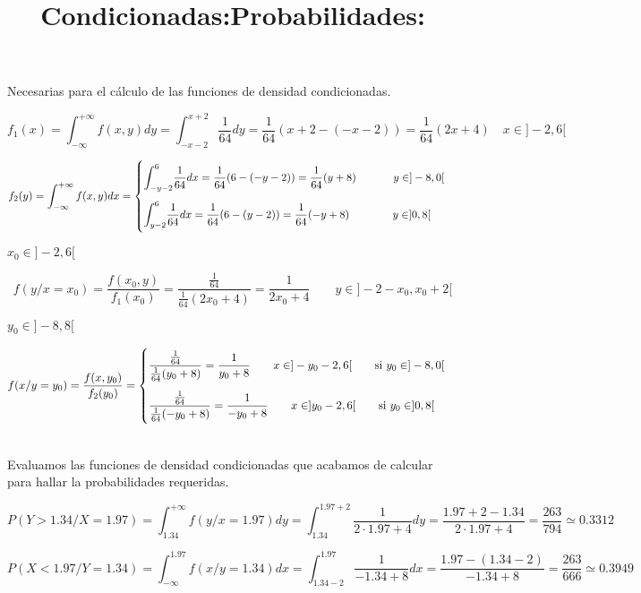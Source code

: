 \documentclass[tikz]{article}
\def\stretchint#1{\vcenter{\hbox{\stretchto[440]{\displaystyle\int}{#1}}}}
\begin{document}
Necesarias para el cálculo de las funciones de densidad condicionadas.

\[f_1(x) = \int_{-\infty}^{+\infty} f(x,y) dy =
\int_{-x-2}^{x+2}\frac{1}{64}dy=\frac{1}{64}(x+2-(-x-2))=\frac{1}{64}(2x+4)
\quad x \in ]-2,6[\]

\[f_2(y) = \int_{-\infty}^{+\infty} f(x,y) dx = \begin{cases} ~
    \vspace{-4mm}\\ \stretchint{5ex}_{\hspace{-1.5mm}-y-2}^6
    \dfrac{1}{64} dx = \dfrac{1}{64}(6-(-y-2))=\dfrac{1}{64}(y+8)
    \hspace{12mm} y \in ]-8,0[ \vspace{3mm}\\
    \stretchint{5ex}_{\hspace{-1.5mm}y-2}^6 \dfrac{1}{64} dx =
    \dfrac{1}{64}(6-(y-2))=\dfrac{1}{64}(-y+8) \hspace{14mm} y \in
    ]0,8[ \\ \vspace{-4mm} ~
  \end{cases}\]

\title{\large \textbf{Condicionadas:}}

\vspace{7mm}

$x_0 \in ]-2,6[$

\[f(y/x=x_0)=\frac{f(x_0,y)}{f_1(x_0)}=\frac{\frac{1}{64}}{\frac{1}{64}(2x_0+4)}=\frac{1}{2x_0+4}
\qquad y \in ]-2-x_0,x_0+2[\]

$y_0 \in ]-8,8[$

\[f(x/y=y_0)=\frac{f(x,y_0)}{f_2(y_0)} = \begin{cases} ~ \vspace{-4mm}
\\ \dfrac{\frac{1}{64}}{\frac{1}{64}(y_0+8)} = \dfrac{1}{y_0+8} \qquad
x \in ]-y_0-2,6[ \qquad \mbox{si } y_0 \in ]-8,0[ \vspace{3mm} \\
\dfrac{\frac{1}{64}}{\frac{1}{64}(-y_0+8)} = \dfrac{1}{-y_0+8} \qquad
x \in ]y_0-2,6[ \qquad \mbox{si } y_0 \in ]0,8[ \\ \vspace{-4mm} ~
\end{cases}\]

\title{\large \textbf{Probabilidades:}} \\

Evaluamos las funciones de densidad condicionadas que acabamos de
calcular para hallar la probabilidades requeridas.

\[P(Y>1.34/X=1.97) = \int_{1.34}^{+\infty}f(y/x=1.97)dy = \int_{1.34}^{1.97+2}\frac{1}{2\cdot 1.97+4}dy = \frac{1.97+2-1.34}{2\cdot1.97+4}=\frac{263}{794} \simeq 0.3312\]

\[P(X<1.97/Y=1.34) = \int_{-\infty}^{1.97}f(x/y=1.34)dx =
  \int_{1.34-2}^{1.97}\frac{1}{-1.34+8}dx =
  \frac{1.97-(1.34-2)}{-1.34+8} = \frac{263}{666} \simeq 0.3949\]
\end{document}
